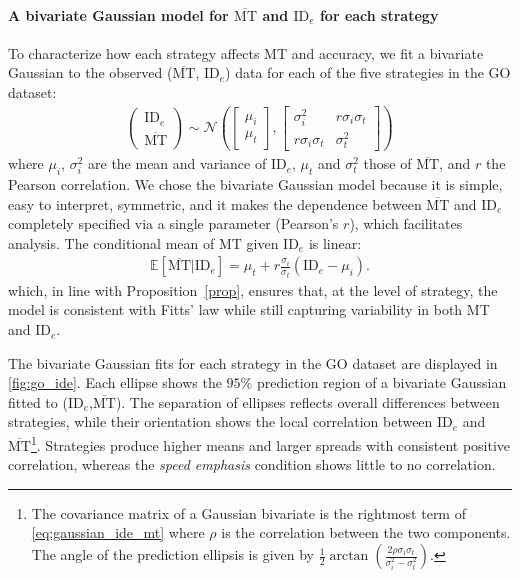 \documentclass[acmlarge, manuscript,review]{acmart}
\newcommand{\mmt}{\ensuremath{\overline{\mt}}\xspace}
\newcommand{\mt}{\ensuremath{{\text{MT}}}\xspace}
\newcommand{\ide}{\ensuremath{{\text{ID}_e}}\xspace}
\begin{document}
\paragraph{A bivariate Gaussian model for \mmt and \ide for each strategy}
To characterize how each strategy affects MT and accuracy, we fit a bivariate Gaussian to the observed (\mmt, \ide) data for each of the five strategies in the GO dataset:
\begin{align}
	\begin{pmatrix}
		\ide \\
		\mmt
	\end{pmatrix} \sim \mathcal{N} \left( \begin{bmatrix}
			                                      \mu_i \\
			                                      \mu_t
		                                      \end{bmatrix}, \begin{bmatrix}
			                                                     \sigma^2_i          & r \sigma_i \sigma_t \\
			                                                     r \sigma_i \sigma_t & \sigma_t^2
		                                                     \end{bmatrix} \right) \label{eq:gaussian_ide_mt}
\end{align}
where $\mu_i$, $\sigma_i^2$ are the mean and variance of \ide, $\mu_t$ and $\sigma_t^2$ those of \mmt, and $r$ the Pearson correlation. 
We chose the bivariate Gaussian model because it is simple, easy to interpret, symmetric, and it makes the dependence between \mmt and \ide completely specified via a single parameter (Pearson's $r$), which facilitates analysis.
The conditional mean of MT given \ide is linear:
\begin{align}
	\mathbb{E}[\mmt | \ide] = \mu_t + r \frac{\sigma_i}{\sigma_t}(\ide - \mu_i).  \label{eq:mmt_ide_gauss}
\end{align}
which, in line with Proposition~\ref{prop}, ensures that, at the level of strategy, the model is consistent with Fitts' law while still capturing variability in both MT and \ide.




The bivariate Gaussian fits for each strategy in the GO dataset are displayed in \autoref{fig:go_ide}. Each ellipse shows the $95\%$ prediction region of a bivariate Gaussian fitted to (\ide,\mmt). The separation of ellipses reflects overall differences between strategies, while their orientation shows the local correlation between \ide and \mmt\footnote{The covariance matrix of a Gaussian bivariate is the rightmost term of \autoref{eq:gaussian_ide_mt} where $\rho$ is the correlation between the two components. The angle of the prediction ellipsis is given by $\frac{1}{2} \arctan \left( \frac{2\rho \sigma_i\sigma_t}{\sigma_i^2 - \sigma_t^2} \right) $.}. Strategies produce higher means and larger spreads with consistent positive correlation, whereas the \textit{speed emphasis} condition shows little to no correlation.%
\end{document}
